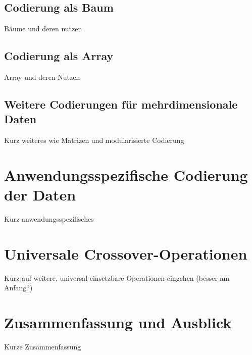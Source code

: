 \documentclass{llncs}
\begin{document}
	\subsection{Codierung als Baum}
	\label{sec:BaumCod}
	
		Bäume und deren nutzen
	
	\subsection{Codierung als Array}
	\label{sec:ArrayCod}
	
		Array und deren Nutzen
	
	\subsection{Weitere Codierungen für mehrdimensionale Daten}
	\label{sec:WeitereMehrdimensionale}
	
		Kurz weiteres wie Matrizen und modularisierte Codierung

\section{Anwendungsspezifische Codierung der Daten}
\label{sec:AnwendungsspezifischeCod}

	Kurz anwendungsspezifisches

\section{Universale Crossover-Operationen}
\label{sec:UniversaleOp}

	Kurz auf weitere, universal einsetzbare Operationen eingehen (besser am Anfang?)

\section{Zusammenfassung und Ausblick}
\label{sec:Zusammenfassung}

	Kurze Zusammenfassung

 






\newpage
\end{document}
